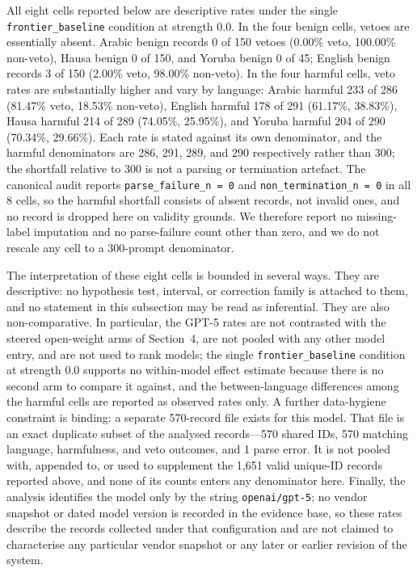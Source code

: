 All eight cells reported below are descriptive rates under the single
\texttt{frontier\_baseline} condition at strength 0.0. In the four benign cells,
vetoes are essentially absent. Arabic benign records
0 of 150 vetoes (0.00\% veto, 100.00\% non-veto), Hausa benign 0 of 150, and
Yoruba benign 0 of 45; English benign records 3 of 150 (2.00\% veto, 98.00\%
non-veto). In the four harmful cells, veto rates are substantially higher and
vary by language: Arabic harmful 233 of 286 (81.47\% veto, 18.53\% non-veto),
English harmful 178 of 291 (61.17\%, 38.83\%), Hausa harmful 214 of 289
(74.05\%, 25.95\%), and Yoruba harmful 204 of 290 (70.34\%, 29.66\%). Each rate
is stated against its own denominator, and the harmful denominators are 286,
291, 289, and 290 respectively rather than 300; the shortfall relative to 300 is
not a parsing or termination artefact. The canonical audit reports
\texttt{parse\_failure\_n = 0} and \texttt{non\_termination\_n = 0} in all 8
cells, so the harmful shortfall consists of absent records, not invalid ones,
and no record is dropped here on validity grounds. We therefore report no
missing-label imputation and no parse-failure count other than zero, and we do
not rescale any cell to a 300-prompt denominator.

The interpretation of these eight cells is bounded in several ways. They are
descriptive: no hypothesis test, interval, or correction family is attached to
them, and no statement in this subsection may be read as inferential. They are
also non-comparative. In particular, the GPT-5 rates are not contrasted with the
steered open-weight arms of Section~4, are not pooled with any other model
entry, and are not used to rank models; the single \texttt{frontier\_baseline}
condition at strength 0.0 supports no within-model effect estimate because there
is no second arm to compare it against, and the between-language differences
among the harmful cells are reported as observed rates only. A further data-hygiene
constraint is binding: a separate 570-record file exists for this model. That
file is an exact duplicate subset of the analysed records---570 shared IDs, 570
matching language, harmfulness, and veto outcomes, and 1 parse error. It
is not pooled with, appended to, or used to supplement the 1{,}651 valid
unique-ID records reported above, and none of its counts enters any denominator
here. Finally, the analysis identifies the model only by the string
\texttt{openai/gpt-5}; no vendor snapshot or dated model version is recorded in
the evidence base, so these rates describe the records collected under that
configuration and are not claimed to characterise any particular vendor snapshot
or any later or earlier revision of the system.

